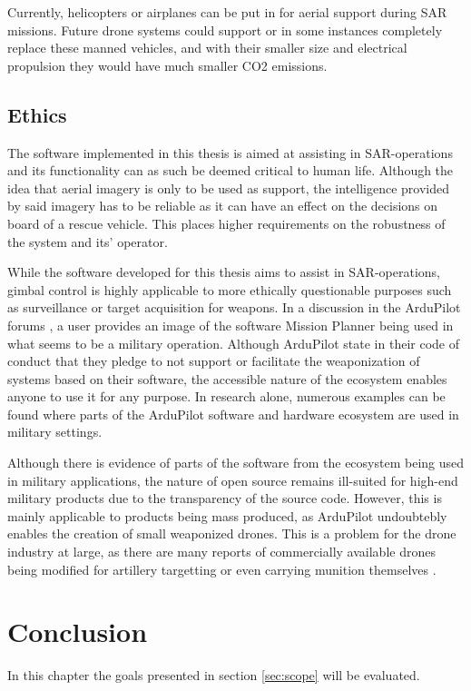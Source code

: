 \documentclass[nofilelist]{cslthse-msc}
\begin{document}
Currently, helicopters or airplanes can be put in for aerial support during SAR missions. Future drone systems could support or in some instances completely replace these manned vehicles, and with their smaller size and electrical propulsion they would have much smaller CO2 emissions.

\section{Ethics}
The software implemented in this thesis is aimed at assisting in SAR-operations and its functionality can as such be deemed critical to human life. Although the idea that aerial imagery is only to be used as support, the intelligence provided by said imagery has to be reliable as it can have an effect on the decisions on board of a rescue vehicle. This places higher requirements on the robustness of the system and its' operator. 

While the software developed for this thesis aims to assist in SAR-operations, gimbal control is highly applicable to more ethically questionable purposes such as surveillance or target acquisition for weapons. In a discussion in the ArduPilot forums \cite{ardupilot-military-discussion}, a user provides an image of the software Mission Planner being used in what seems to be a military operation. Although ArduPilot state in their code of conduct \cite{ardupilot-coc} that they pledge to not support or facilitate the weaponization of systems based on their software, the accessible nature of the ecosystem enables anyone to use it for any purpose. In research alone, numerous examples can be found \cite{ardupilot-military} \cite{ardupilot-military-1} where parts of the ArduPilot software and hardware ecosystem are used in military settings.

Although there is evidence of parts of the software from the ecosystem being used in military applications, the nature of open source remains ill-suited for high-end military products due to the transparency of the source code. However, this is mainly applicable to products being mass produced, as ArduPilot undoubtebly enables the creation of small weaponized drones. This is a problem for the drone industry at large, as there are many reports of commercially available drones being modified for artillery targetting or even carrying munition themselves \cite{drones-ukraine}. 

\chapter{Conclusion}
In this chapter the goals presented in section \ref{sec:scope} will be evaluated.
\end{document}
